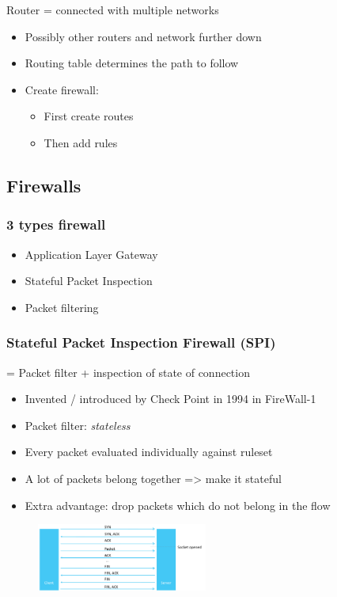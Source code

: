 \documentclass{article}
\begin{document}
Router = connected with multiple networks

\begin{itemize}
    \item Possibly other routers and network further down
    \item Routing table determines the path to follow
    \item Create firewall:
    \begin{itemize}
        \item First create routes
        \item Then add rules
    \end{itemize}
\end{itemize}


\subsection{Firewalls}

\subsubsection{3 types firewall}

\begin{itemize}
    \item Application Layer Gateway
    \item Stateful Packet Inspection
    \item Packet filtering
\end{itemize}

\subsubsection{Stateful Packet Inspection Firewall (SPI)}

= Packet filter + inspection of state of connection

\begin{itemize}
    \item Invented / introduced by Check Point in 1994 in FireWall-1
    \item Packet filter: \textit{stateless}
    \item Every packet evaluated individually against ruleset
    \item A lot of packets belong together => make it stateful
    \item Extra advantage: drop packets which do not belong in the flow
\end{itemize}

\begin{figure}[H]
    \centering
    \includegraphics[width=0.5\textwidth]{stateful-packet-inspection.png}
    \caption{}
\end{figure}
\end{document}
